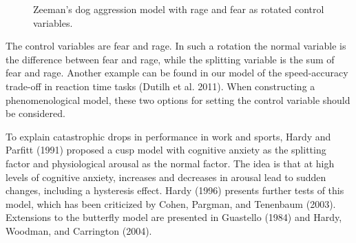 \documentclass[
  a4paper,
  DIV=11,
  numbers=noendperiod,
  oneside]{scrreprt}
\begin{document}
\begin{figure}


\caption{\label{fig-ch3-img17-old-29}Zeeman's dog aggression model with
rage and fear as rotated control variables.}

\end{figure}%

The control variables are fear and rage. In such a rotation the normal
variable is the difference between fear and rage, while the splitting
variable is the sum of fear and rage. Another example can be found in
our model of the speed-accuracy trade-off in reaction time tasks (Dutilh
et al. 2011). When constructing a phenomenological model, these two
options for setting the control variable should be considered.

To explain catastrophic drops in performance in work and sports, Hardy
and Parfitt (1991) proposed a cusp model with cognitive anxiety as the
splitting factor and physiological arousal as the normal factor. The
idea is that at high levels of cognitive anxiety, increases and
decreases in arousal lead to sudden changes, including a hysteresis
effect. Hardy (1996) presents further tests of this model, which has
been criticized by Cohen, Pargman, and Tenenbaum (2003). Extensions to
the butterfly model are presented in Guastello (1984) and Hardy,
Woodman, and Carrington (2004).
\end{document}
